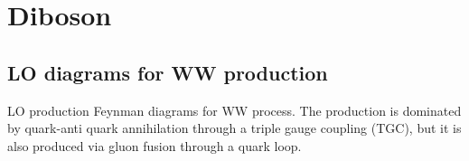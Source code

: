 \section{Diboson}
\label{SectionDibosons} %



\subsection{LO diagrams for WW production} 
LO production Feynman diagrams for WW process. The production is dominated by quark-anti quark annihilation through a triple gauge coupling (TGC), but it is also produced via gluon fusion through a quark loop. 

\vspace{7mm}

